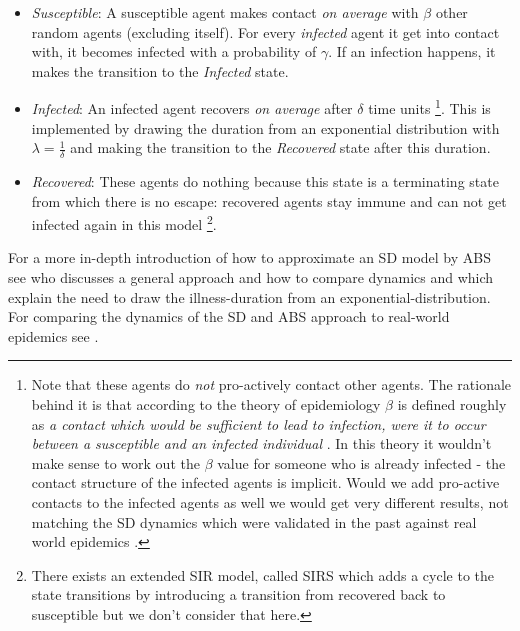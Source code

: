 \begin{itemize}
	\item \textit{Susceptible}: A susceptible agent makes contact \textit{on average} with $\beta$ other random agents (excluding itself). For every \textit{infected} agent it get into contact with, it becomes infected with a probability of $\gamma$. If an infection happens, it makes the transition to the \textit{Infected} state.

	\item \textit{Infected}: An infected agent recovers \textit{on average} after $\delta$ time units \footnote{Note that these agents do \textit{not} pro-actively contact other agents. The rationale behind it is that according to the theory of epidemiology $\beta$ is defined roughly as \textit{a contact which would be sufficient to lead to infection, were it to occur between a susceptible and an infected individual} \cite{abbey_examination_1952}. In this theory it wouldn't make sense to work out the $\beta$ value for someone who is already infected - the contact structure of the infected agents is implicit. Would we add pro-active contacts to the infected agents as well we would get very different results, not matching the SD dynamics which were validated in the past against real world epidemics \cite{ahmed_variance_2013}.}. This is implemented by drawing the duration from an exponential distribution \cite{borshchev_system_2004} with $\lambda = \frac{1}{\delta}$ and making the transition to the \textit{Recovered} state after this duration.

	\item \textit{Recovered}: These agents do nothing because this state is a terminating state from which there is no escape: recovered agents stay immune and can not get infected again in this model \footnote{There exists an extended SIR model, called SIRS which adds a cycle to the state transitions by introducing a transition from recovered back to susceptible but we don't consider that here.}.
\end{itemize}

For a more in-depth introduction of how to approximate an SD model by ABS see \cite{macal_agent-based_2010} who discusses a general approach and how to compare dynamics and \cite{borshchev_system_2004} which explain the need to draw the illness-duration from an exponential-distribution. For comparing the dynamics of the SD and ABS approach to real-world epidemics see \cite{ahmed_variance_2013}.